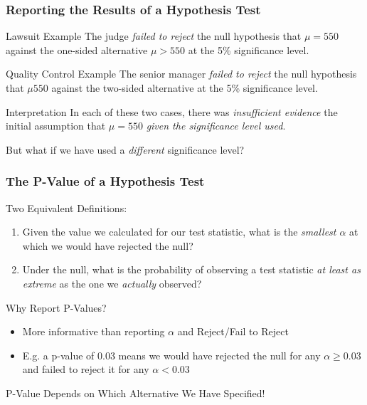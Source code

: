 \documentclass[handout]{beamer}
\begin{document}
\begin{frame}
	\frametitle{Reporting the Results of a Hypothesis Test}
	\begin{block}
		{Lawsuit Example}
		The judge \emph{failed to reject} the null hypothesis that $\mu = 550$ against the one-sided alternative $\mu > 550$ at the 5\% significance level.
	\end{block}
	\begin{block}
		{Quality Control Example}
		The senior manager \emph{failed to reject} the null hypothesis that $\mu 550$ against the two-sided alternative at the 5\% significance level.
	\end{block}
	\begin{block}
		{Interpretation}
		In each of these two cases, there was \emph{insufficient evidence} the initial assumption that $\mu = 550$ \emph{given the significance level used}.
	\end{block}
	\alert{But what if we have used a \emph{different} significance level?}
\end{frame}
\begin{frame}
	\frametitle{The P-Value of a Hypothesis Test}
	\begin{block}
		{Two Equivalent Definitions:}
		\begin{enumerate}
			\item Given the value we calculated for our test statistic, what is the \emph{smallest $\alpha$} at which we would have rejected the null?
			\item Under the null, what is the probability of observing a test statistic \emph{at least as extreme} as the one we \emph{actually} observed?
		\end{enumerate}
	\end{block}
	\begin{block}
		{Why Report P-Values?}
		\begin{itemize}
			\item More informative than reporting $\alpha$ and Reject/Fail to Reject
			\item E.g. a p-value of 0.03 means we would have rejected the null for any $\alpha \geq 0.03$ and failed to reject it for any $\alpha < 0.03$ 
		\end{itemize}
	\end{block}
\end{frame}

\begin{frame}
\begin{center}
\huge P-Value Depends on Which Alternative We Have Specified!
\end{center}
\end{frame}
\end{document}
